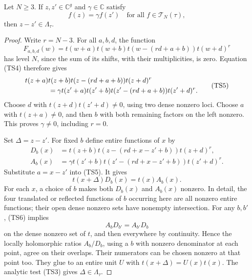 \begin{proposition}
\label{prop:ftb-torus-theta-point-separation}
Let \(N\ge3\).
If \(z,z'\in\mathbb C^g\) and \(\gamma\in\mathbb C\)
satisfy
\[
             f(z)=\gamma f(z')
                         \quad\text{for all }f\in\mathcal T_N(\tau),
                                                               \tag{TS4}
\]
then \(z-z'\in\Lambda_\tau\).
\end{proposition}
\begin{proof}
Write \(r=N-3\).
For all \(a,b,d\), the function
\[
 F_{a,b,d}(w)=
 t(w+a)t(w+b)t(w-(rd+a+b))t(w+d)^r
\]
has level \(N\), since the sum of its shifts, with their
multiplicities, is zero.
Equation (TS4) therefore gives
\[
 \begin{split}
 &t(z+a)t(z+b)t(z-(rd+a+b))t(z+d)^r\\
 &\hspace{12mm}=
 \gamma t(z'+a)t(z'+b)t(z'-(rd+a+b))t(z'+d)^r .
 \end{split}                                             \tag{TS5}
\]
Choose \(d\) with \(t(z+d)t(z'+d)\ne0\), using two dense
nonzero loci.
Choose \(a\) with \(t(z+a)\ne0\), and then \(b\) with both
remaining factors on the left nonzero.
This proves \(\gamma\ne0\), including \(r=0\).

Set \(\Delta=z-z'\).  For fixed \(b\) define entire functions
of \(x\) by
\[
 \begin{split}
 D_b(x)&=t(z+b)t(z-(rd+x-z'+b))t(z+d)^r,\\
 A_b(x)&=\gamma t(z'+b)t(z'-(rd+x-z'+b))t(z'+d)^r.
 \end{split}
\]
Substitute \(a=x-z'\) into (TS5).  It gives
\[
                    t(x+\Delta)D_b(x)=t(x)A_b(x).        \tag{TS6}
\]
For each \(x\), a choice of \(b\) makes both \(D_b(x)\)
and \(A_b(x)\) nonzero.
In detail, the four translated or reflected functions
of \(b\) occurring here are all nonzero entire functions;
their open dense nonzero sets have nonempty intersection.
For any \(b,b'\), (TS6) implies
\[
                       A_bD_{b'}=A_{b'}D_b
\]
on the dense nonzero set of \(t\), and then everywhere
by continuity.
Hence the locally holomorphic ratios \(A_b/D_b\), using
a \(b\) with nonzero denominator at each point, agree
on their overlaps.
Their numerators can be chosen nonzero at that point
too.  They glue to an entire unit \(U\) with
\(t(x+\Delta)=U(x)t(x)\).
The analytic test (TS3) gives \(\Delta\in\Lambda_\tau\).
\end{proof}

